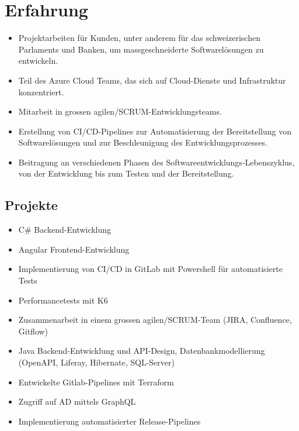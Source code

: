 \section{Erfahrung}
\begin{itemize}
    \item Projektarbeiten für Kunden, unter anderem für das schweizerischen Parlaments und Banken, um massgeschneiderte Softwarelösungen zu entwickeln.
    \item Teil des Azure Cloud Teams, das sich auf Cloud-Dienste und Infrastruktur konzentriert.
    \item Mitarbeit in grossen agilen/SCRUM-Entwicklungsteams.
    \item Erstellung von CI/CD-Pipelines zur Automatisierung der Bereitstellung von Softwarelösungen und zur Beschleunigung des Entwicklungsprozesses.
    \item Beitragung an verschiedenen Phasen des Softwareentwicklungs-Lebenszyklus, von der Entwicklung bis zum Testen und der Bereitstellung.
\end{itemize}
\subsection*{Projekte}
\begin{itemize}
    \item C\# Backend-Entwicklung
    \item Angular Frontend-Entwicklung
    \item Implementierung von CI/CD in GitLab mit Powershell für automatisierte Tests
    \item Performancetests mit K6
\end{itemize}
\dottedline
{}
\begin{itemize}
    \item Zusammenarbeit in einem grossen agilen/SCRUM-Team (JIRA, Confluence, Gitflow)
    \item Java Backend-Entwicklung und API-Design, Datenbankmodellierung (OpenAPI, Liferay, Hibernate, SQL-Server)
\end{itemize}
\dottedline
{}
\begin{itemize}
    \item Entwickelte Gitlab-Pipelines mit Terraform
    \item Zugriff auf AD mittels GraphQL
    \item Implementierung automatisierter Release-Pipelines
\end{itemize}

